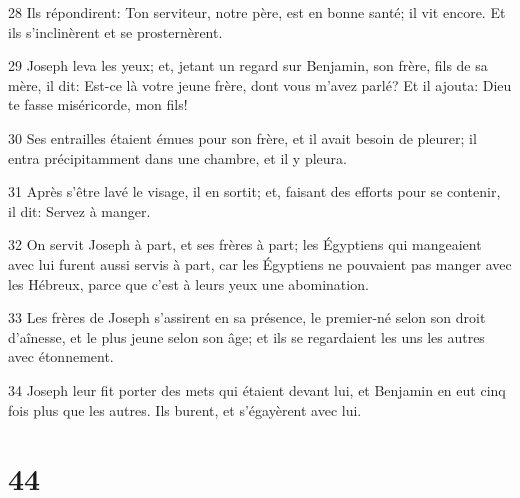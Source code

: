 \par 28 Ils répondirent: Ton serviteur, notre père, est en bonne santé; il vit encore. Et ils s'inclinèrent et se prosternèrent.
\par 29 Joseph leva les yeux; et, jetant un regard sur Benjamin, son frère, fils de sa mère, il dit: Est-ce là votre jeune frère, dont vous m'avez parlé? Et il ajouta: Dieu te fasse miséricorde, mon fils!
\par 30 Ses entrailles étaient émues pour son frère, et il avait besoin de pleurer; il entra précipitamment dans une chambre, et il y pleura.
\par 31 Après s'être lavé le visage, il en sortit; et, faisant des efforts pour se contenir, il dit: Servez à manger.
\par 32 On servit Joseph à part, et ses frères à part; les Égyptiens qui mangeaient avec lui furent aussi servis à part, car les Égyptiens ne pouvaient pas manger avec les Hébreux, parce que c'est à leurs yeux une abomination.
\par 33 Les frères de Joseph s'assirent en sa présence, le premier-né selon son droit d'aînesse, et le plus jeune selon son âge; et ils se regardaient les uns les autres avec étonnement.
\par 34 Joseph leur fit porter des mets qui étaient devant lui, et Benjamin en eut cinq fois plus que les autres. Ils burent, et s'égayèrent avec lui.

\chapter{44}

